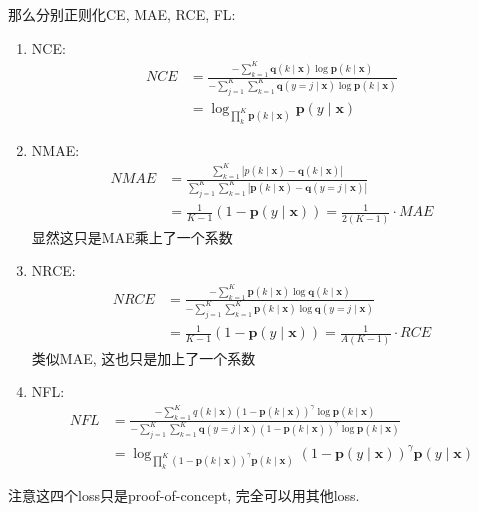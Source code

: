 \documentclass{article}
\begin{document}
那么分别正则化CE, MAE, RCE, FL:
\begin{enumerate}
    \item NCE:\begin{equation}
        \begin{aligned}
        N C E &=\frac{-\sum_{k=1}^{K} \boldsymbol{q}(k \mid \boldsymbol{x}) \log \boldsymbol{p}(k \mid \boldsymbol{x})}{-\sum_{j=1}^{K} \sum_{k=1}^{K} \boldsymbol{q}(y=j \mid \boldsymbol{x}) \log \boldsymbol{p}(k \mid \boldsymbol{x})} \\
        &=\log _{\prod_{k}^{K} \boldsymbol{p}(k \mid \boldsymbol{x})} \boldsymbol{p}(y \mid \boldsymbol{x})
        \end{aligned}
    \end{equation}
    \item NMAE:\begin{equation}
        \begin{aligned}
        N M A E &=\frac{\sum_{k=1}^{K}|p(k \mid \boldsymbol{x})-\boldsymbol{q}(k \mid \boldsymbol{x})|}{\sum_{j=1}^{K} \sum_{k=1}^{K}|\boldsymbol{p}(k \mid \boldsymbol{x})-\boldsymbol{q}(y=j \mid \boldsymbol{x})|} \\
        &=\frac{1}{K-1}(1-\boldsymbol{p}(y \mid \boldsymbol{x}))=\frac{1}{2(K-1)} \cdot M A E
        \end{aligned}
    \end{equation} 
    显然这只是MAE乘上了一个系数
    \item NRCE: \begin{equation}
        \begin{aligned}
        N R C E &=\frac{-\sum_{k=1}^{K} \boldsymbol{p}(k \mid \boldsymbol{x}) \log \boldsymbol{q}(k \mid \boldsymbol{x})}{-\sum_{j=1}^{K} \sum_{k=1}^{K} \boldsymbol{p}(k \mid \boldsymbol{x}) \log \boldsymbol{q}(y=j \mid \boldsymbol{x})} \\
        &=\frac{1}{K-1}(1-\boldsymbol{p}(y \mid \boldsymbol{x}))=\frac{1}{A(K-1)} \cdot R C E
        \end{aligned}
    \end{equation}
    类似MAE, 这也只是加上了一个系数
    \item NFL:\begin{equation}
        \begin{aligned}
        N F L &=\frac{-\sum_{k=1}^{K} q(k \mid \boldsymbol{x})(1-\boldsymbol{p}(k \mid \boldsymbol{x}))^{\gamma} \log \boldsymbol{p}(k \mid \boldsymbol{x})}{-\sum_{j=1}^{K} \sum_{k=1}^{K} \boldsymbol{q}(y=j \mid \boldsymbol{x})(1-\boldsymbol{p}(k \mid \boldsymbol{x}))^{\gamma} \log \boldsymbol{p}(k \mid \boldsymbol{x})} \\
        &=\log _{\prod_{k}^{K}(1-\boldsymbol{p}(k \mid \boldsymbol{x}))^{\gamma} \boldsymbol{p}(k \mid \boldsymbol{x})}(1-\boldsymbol{p}(y \mid \boldsymbol{x}))^{\gamma} \boldsymbol{p}(y \mid \boldsymbol{x})
        \end{aligned}
    \end{equation}
\end{enumerate}
注意这四个loss只是proof-of-concept, 完全可以用其他loss.
\end{document}
